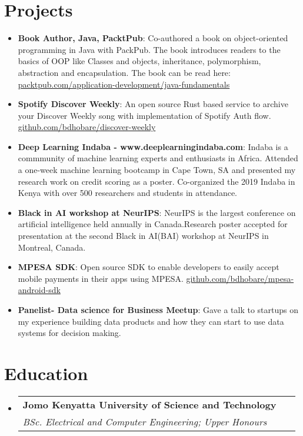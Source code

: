 \documentclass[letterpaper,11pt]{article}
\makeatletter
\newcommand{\resumeItem}[2]{
  \item\small{
    \textbf{#1}{: #2 \vspace{-2pt}}
  }
}
\newcommand{\resumeSubheading}[4]{
  \vspace{-1pt}\item
    \begin{tabular*}{0.97\textwidth}{l@{\extracolsep{\fill}}r}
      \textbf{#1} & #2 \\
      \textit{\small#3} & \textit{\small #4} \\
    \end{tabular*}\vspace{-5pt}
}
\newcommand{\resumeSubItem}[2]{\resumeItem{#1}{#2}\vspace{-4pt}}
\newcommand{\resumeSubHeadingListStart}{\begin{itemize}[leftmargin=*]}
\newcommand{\resumeSubHeadingListEnd}{\end{itemize}}
\makeatother
\begin{document}
\section{Projects}
  \resumeSubHeadingListStart
	\resumeSubItem{Book Author, Java, PacktPub}
      {Co-authored a book on object-oriented programming in Java with PackPub. The book introduces readers to the basics of OOP like Classes and objects, inheritance, polymorphism, abstraction and encapsulation. The book can be read here:\href{https://www.packtpub.com/application-development/java-fundamentals}{ packtpub.com/application-development/java-fundamentals}}  	
	\resumeSubItem {Spotify Discover Weekly}
	{An open source Rust based service to archive your Discover Weekly song with implementation of Spotify Auth flow.}\href{https://github.com/bdhobare/discover-weekly}{github.com/bdhobare/discover-weekly}  	
  	\resumeSubItem{Deep Learning Indaba - www.deeplearningindaba.com}
      {Indaba is a commmunity of machine learning experts and enthusiasts in Africa. Attended a one-week machine learning bootcamp in Cape Town, SA and presented my research work on credit scoring as a poster. Co-organized the 2019 Indaba in Kenya with over 500 researchers and students in attendance.}
  	\resumeSubItem{Black in AI workshop at NeurIPS}
      {NeurIPS is the largest conference on artificial intelligence held annually in Canada.Research poster accepted for presentation at the second Black in AI(BAI) workshop at NeurIPS in Montreal, Canada.}
    \resumeSubItem{MPESA SDK}
      {Open source SDK to enable developers to easily accept mobile payments in their apps using MPESA.}\href{https://github.com/bdhobare/mpesa-android-sdk}{github.com/bdhobare/mpesa-android-sdk}
    \resumeSubItem{Panelist- Data science for Business Meetup}
      {Gave a talk to startups on my experience building data products and how they can start to use data systems for decision making.}
  \resumeSubHeadingListEnd

\section{Education}
  \resumeSubHeadingListStart
    \resumeSubheading
      {Jomo Kenyatta University of Science and Technology}{}
      {BSc. Electrical and Computer Engineering; Upper Honours}
      \
  \resumeSubHeadingListEnd





\end{document}
